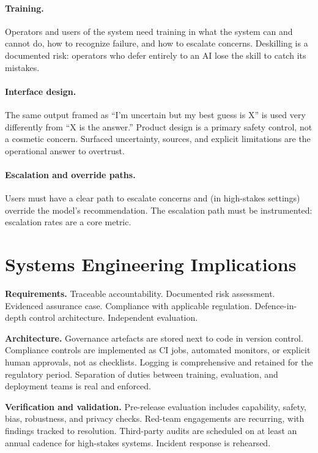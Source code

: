 \paragraph{Training.} Operators and users of the system need
training in what the system can and cannot do, how to recognize
failure, and how to escalate concerns. Deskilling
\citep{reason1990human} is a documented risk: operators who
defer entirely to an AI lose the skill to catch its mistakes.

\paragraph{Interface design.} The same output framed as
``I'm uncertain but my best guess is X'' is used very differently
from ``X is the answer.'' Product design is a primary safety
control, not a cosmetic concern. Surfaced uncertainty, sources,
and explicit limitations are the operational answer to
overtrust.

\paragraph{Escalation and override paths.} Users must have a
clear path to escalate concerns and (in high-stakes settings)
override the model's recommendation. The escalation path must
be instrumented: escalation rates are a core metric.

\section{Systems Engineering Implications}

\textbf{Requirements.}
Traceable accountability. Documented risk assessment. Evidenced
assurance case. Compliance with applicable regulation.
Defence-in-depth control architecture. Independent evaluation.

\textbf{Architecture.}
Governance artefacts are stored next to code in version control.
Compliance controls are implemented as CI jobs, automated
monitors, or explicit human approvals, not as checklists.
Logging is comprehensive and retained for the regulatory period.
Separation of duties between training, evaluation, and
deployment teams is real and enforced.

\textbf{Verification and validation.}
Pre-release evaluation includes capability, safety, bias,
robustness, and privacy checks. Red-team engagements are
recurring, with findings tracked to resolution. Third-party
audits are scheduled on at least an annual cadence for
high-stakes systems. Incident response is rehearsed.

